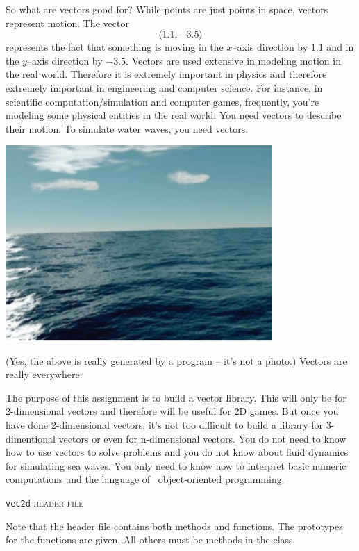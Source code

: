 So what are vectors good for?
While points are just points in space, vectors represent motion. The vector
\[
	\langle 1.1, -3.5 \rangle
\]
represents the fact that something is moving in the $x$--axis direction by
$1.1$ and in the $y$--axis direction by $-3.5$.
Vectors are used extensive in modeling motion in the
real world.
Therefore it is extremely
important in physics and therefore extremely important in engineering
and computer
science. For instance, in scientific computation/simulation
and computer games,
frequently, you're modeling some physical entities in the real world. You need
vectors to describe their motion. To simulate water waves, you need vectors.

\begin{center}
  \includegraphics[width=4in]{vec2d.JPG}
\end{center}

(Yes, the above is really generated by a program – it's not a photo.)
Vectors are really everywhere.

The purpose of this assignment is to build a vector library.
This will only be for
2-dimensional vectors and therefore will be useful for 2D games.
But once you have
done 2-dimensional vectors, it's not too difficult to build a library for
3-dimentional vectors or even for n-dimensional vectors.
You do not need to know how to use
vectors to solve problems and you do not know about fluid
dynamics for simulating sea
waves.
You only need to know how to interpret basic numeric computations and the
language of \cpp\ object-oriented programming.





\newpage
\texttt{vec2d} \textsc{header file}

Note that the header file contains both methods and functions.
The prototypes for the
functions are given. All others must be methods in the class.

